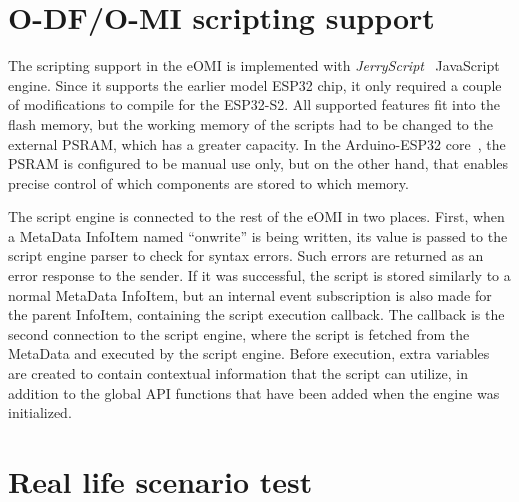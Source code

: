 \section{O-DF/O-MI scripting support}

The scripting support in the eOMI is implemented with \emph{JerryScript}~\cite{jerryscript} JavaScript engine. Since it supports the earlier model ESP32 chip, it only required a couple of modifications to compile for the ESP32-S2. All supported features fit into the flash memory, but the working memory of the scripts had to be changed to the external PSRAM, which has a greater capacity. In the Arduino-ESP32 core~\cite{arduino-esp32}, the PSRAM is configured to be manual use only, but on the other hand, that enables precise control of which components are stored to which memory.

The script engine is connected to the rest of the eOMI in two places. First, when a MetaData InfoItem named ``onwrite'' is being written, its value is passed to the script engine parser to check for syntax errors. Such errors are returned as an error response to the sender. If it was successful, the script is stored similarly to a normal MetaData InfoItem, but an internal event subscription is also made for the parent InfoItem, containing the script execution callback. The callback is the second connection to the script engine, where the script is fetched from the MetaData and executed by the script engine. Before execution, extra variables are created to contain contextual information that the script can utilize, in addition to the global API functions that have been added when the engine was initialized.




\section{Real life scenario test}

